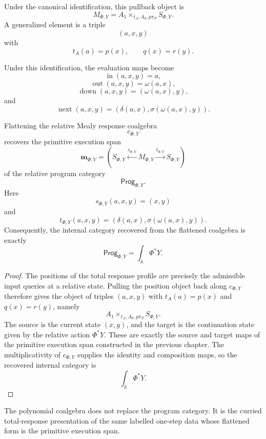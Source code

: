 Under the canonical identification, this pullback object is
\[
M_{\Phi,Y}
=
A_1\times_{t_A,A_0,p\pi_P}S_{\Phi,Y}.
\]
A generalized element is a triple
\[
(a,x,y)
\]
with
\[
t_A(a)=p(x),
\qquad
q(x)=r(y).
\]

Under this identification, the evaluation maps become
\[
\operatorname{in}(a,x,y)=a,
\]
\[
\operatorname{out}(a,x,y)=\omega(a,x),
\]
\[
\operatorname{down}(a,x,y)=(\omega(a,x),y),
\]
and
\[
\operatorname{next}(a,x,y)
=
\left(
\delta(a,x),
\sigma(\omega(a,x),y)
\right).
\]

\begin{theorem}
\label{thm:poly-relative-program-category-recovered}
Flattening the relative Mealy response coalgebra
\[
c_{\Phi,Y}
\]
recovers the primitive execution span
\[
\mathbf m_{\Phi,Y}
=
\left(
S_{\Phi,Y}
\xleftarrow{s_{\Phi,Y}}
M_{\Phi,Y}
\xrightarrow{t_{\Phi,Y}}
S_{\Phi,Y}
\right)
\]
of the relative program category
\[
\mathsf{Prog}_{\Phi,Y}.
\]
Here
\[
s_{\Phi,Y}(a,x,y)=(x,y)
\]
and
\[
t_{\Phi,Y}(a,x,y)
=
\left(
\delta(a,x),
\sigma(\omega(a,x),y)
\right).
\]
Consequently, the internal category recovered from the flattened coalgebra is
exactly
\[
\mathsf{Prog}_{\Phi,Y}
=
\int_{\mathbb A}\Phi^\ast Y.
\]
\end{theorem}

\begin{proof}
The positions of the total response profile are precisely the admissible input
queries at a relative state.  Pulling the position object back along
\(c_{\Phi,Y}\) therefore gives the object of triples \((a,x,y)\) with
\(t_A(a)=p(x)\) and \(q(x)=r(y)\), namely
\[
A_1\times_{t_A,A_0,p\pi_P}S_{\Phi,Y}.
\]
The source is the current state \((x,y)\), and the target is the continuation
state given by the relative action \(\Phi^\ast Y\).  These are exactly the
source and target maps of the primitive execution span constructed in the
previous chapter.  The multiplicativity of \(c_{\Phi,Y}\) supplies the identity
and composition maps, so the recovered internal category is
\[
\int_{\mathbb A}\Phi^\ast Y.
\]
\end{proof}

\begin{remark}
\label{rem:poly-relative-not-replacement}
The polynomial coalgebra does not replace the program category.  It is the
curried total-response presentation of the same labelled one-step data whose
flattened form is the primitive execution span.
\end{remark}

